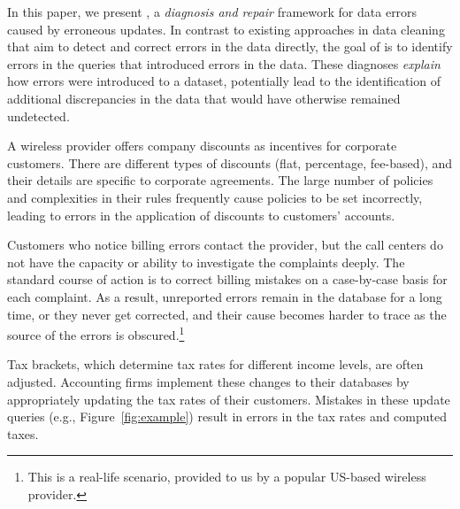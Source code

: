 In this paper, we present \sys, a \emph{diagnosis and repair} framework for data errors
caused by erroneous updates. In contrast to existing approaches in data
cleaning that aim to detect and correct errors in the data directly, the goal
of \sys is to identify errors in the queries that introduced errors in the
data. These diagnoses \emph{explain} how errors were introduced to a
dataset,  potentially lead to the identification of additional discrepancies in
the data that would have otherwise remained undetected.  

\begin{example}\label{ex:telco}

A  wireless provider offers company discounts as incentives for
corporate customers. There are different types of discounts (flat, percentage,
fee-based), and their details are specific to corporate agreements. The large
number of policies and complexities in their rules frequently cause policies
to be set incorrectly, leading to errors in the application of discounts to
customers' accounts.

Customers who notice billing errors contact the provider, but the call centers
do not have the capacity or ability to investigate the complaints deeply. The
standard course of action is to correct billing mistakes on a case-by-case
basis for each complaint. As a result, unreported errors remain in the
database for a long time, or they never get corrected, and their cause becomes
harder to trace as the source of the errors is obscured.\footnote{This is a real-life scenario, provided to us by a popular US-based wireless provider.}

\end{example}

\begin{example}\label{ex:taxes}
    
Tax brackets, which determine tax rates for different income levels, are
often adjusted. Accounting firms implement these changes to their
databases by appropriately updating the tax rates of their customers. Mistakes
in these update queries (e.g., Figure~\ref{fig:example}) result in errors in
the tax rates and computed taxes. 

\end{example}

